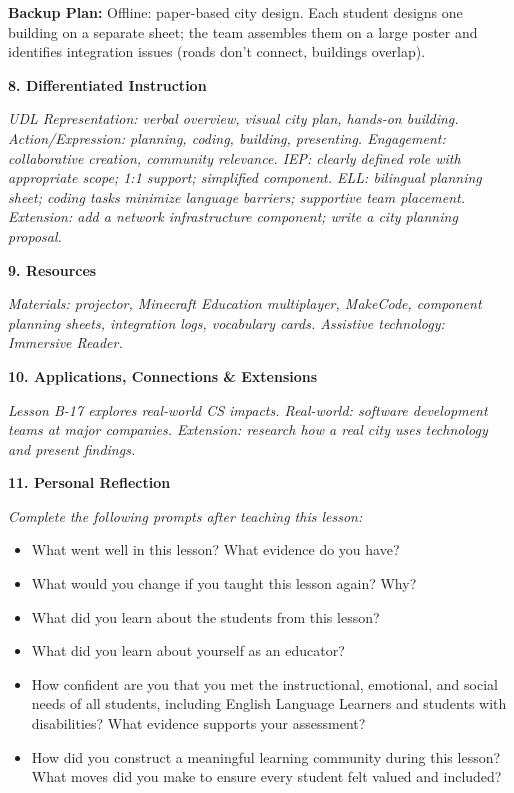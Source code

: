 \documentclass[11pt,letterpaper]{article}
\begin{document}
\textbf{Backup Plan: }Offline: paper-based city design. Each student designs one building on a separate sheet; the team assembles them on a large poster and identifies integration issues (roads don't connect, buildings overlap).

\newpage
\textbf{8. Differentiated Instruction}

\textit{UDL Representation: verbal overview, visual city plan, hands-on building. Action/Expression: planning, coding, building, presenting. Engagement: collaborative creation, community relevance. IEP: clearly defined role with appropriate scope; 1:1 support; simplified component. ELL: bilingual planning sheet; coding tasks minimize language barriers; supportive team placement. Extension: add a network infrastructure component; write a city planning proposal.}

\textbf{9. Resources}

\textit{Materials: projector, Minecraft Education multiplayer, MakeCode, component planning sheets, integration logs, vocabulary cards. Assistive technology: Immersive Reader.}

\textbf{10. Applications, Connections \& Extensions}

\textit{Lesson B-17 explores real-world CS impacts. Real-world: software development teams at major companies. Extension: research how a real city uses technology and present findings.}

\textbf{11. Personal Reflection}

\textit{Complete the following prompts after teaching this lesson:}

\begin{itemize}
  \item What went well in this lesson? What evidence do you have?

  \item What would you change if you taught this lesson again? Why?

  \item What did you learn about the students from this lesson?

  \item What did you learn about yourself as an educator?

  \item How confident are you that you met the instructional, emotional, and social needs of all students, including English Language Learners and students with disabilities? What evidence supports your assessment?

  \item How did you construct a meaningful learning community during this lesson? What moves did you make to ensure every student felt valued and included?
\end{itemize}
\end{document}
